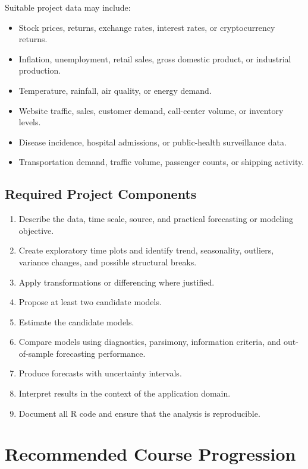 \documentclass[11pt]{article}
\begin{document}
Suitable project data may include:
\begin{itemize}
    \item Stock prices, returns, exchange rates, interest rates, or cryptocurrency returns.
    \item Inflation, unemployment, retail sales, gross domestic product, or industrial production.
    \item Temperature, rainfall, air quality, or energy demand.
    \item Website traffic, sales, customer demand, call-center volume, or inventory levels.
    \item Disease incidence, hospital admissions, or public-health surveillance data.
    \item Transportation demand, traffic volume, passenger counts, or shipping activity.
\end{itemize}

\subsection{Required Project Components}

\begin{enumerate}
    \item Describe the data, time scale, source, and practical forecasting or modeling objective.
    \item Create exploratory time plots and identify trend, seasonality, outliers, variance changes, and possible structural breaks.
    \item Apply transformations or differencing where justified.
    \item Propose at least two candidate models.
    \item Estimate the candidate models.
    \item Compare models using diagnostics, parsimony, information criteria, and out-of-sample forecasting performance.
    \item Produce forecasts with uncertainty intervals.
    \item Interpret results in the context of the application domain.
    \item Document all R code and ensure that the analysis is reproducible.
\end{enumerate}

\section{Recommended Course Progression}
\end{document}
